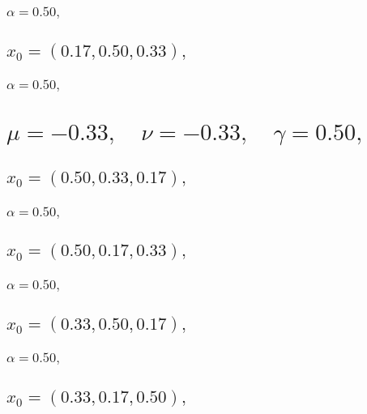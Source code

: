 \documentclass[a4paper]{article}
\begin{document}
\begin{multicols*}{2}
   \subsubsection{\(\alpha = 0.50,\quad \)}
   

   \subsection{\(x_0 = (0.17,0.50,0.33),\quad \)}
   

   \subsubsection{\(\alpha = 0.50,\quad \)}
   

   \section{\(\mu = -0.33,\quad \nu = -0.33,\quad \gamma = 0.50,\quad \)}
   

   \subsection{\(x_0 = (0.50,0.33,0.17),\quad \)}
   

   \subsubsection{\(\alpha = 0.50,\quad \)}
   

   \subsection{\(x_0 = (0.50,0.17,0.33),\quad \)}
   

   \subsubsection{\(\alpha = 0.50,\quad \)}
   

   \subsection{\(x_0 = (0.33,0.50,0.17),\quad \)}
   

   \subsubsection{\(\alpha = 0.50,\quad \)}
   

   \subsection{\(x_0 = (0.33,0.17,0.50),\quad \)}
   


\end{multicols*}
\end{document}
